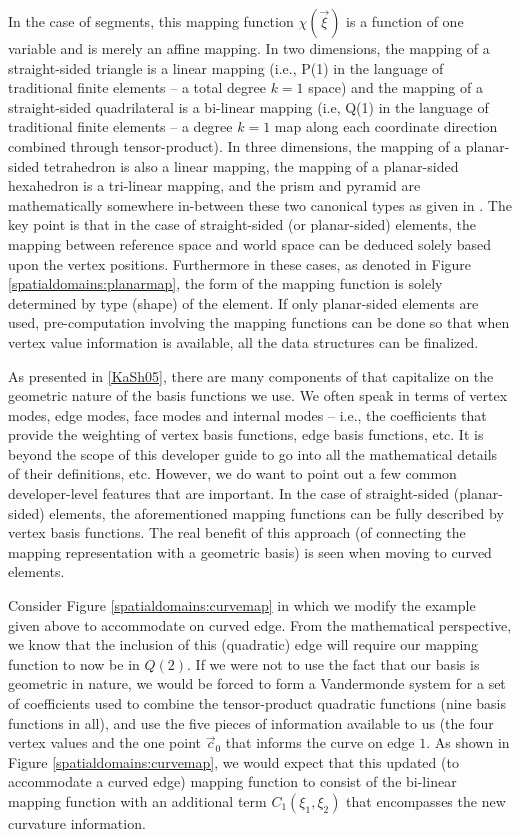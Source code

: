 In the case of segments, this mapping function $\chi(\vec{\xi})$ is a function of one variable and is merely an affine mapping.  In two dimensions, the 
mapping of a straight-sided triangle is a linear mapping (i.e., P(1) in the language of traditional finite elements -- a total degree $k=1$ space) and
the mapping of a straight-sided quadrilateral is a bi-linear mapping (i.e, Q(1) in the language of traditional finite elements -- a degree $k=1$ map along each
coordinate direction combined through tensor-product).  In three dimensions, the mapping of a planar-sided tetrahedron is also a linear mapping, the
mapping of a planar-sided hexahedron is a tri-linear mapping, and the prism and pyramid are mathematically somewhere in-between these two canonical
types as given in \cite{KaSh05}.  The key point is that in the case of straight-sided (or planar-sided) elements, the mapping between reference space and
world space can be deduced solely based upon the vertex positions.  Furthermore in these cases, 
as denoted in Figure \ref{spatialdomains:planarmap}, the form of the mapping function is solely determined by type (shape) of the element.  If
only planar-sided elements are used, pre-computation involving the mapping functions can be done so that when vertex value information is available,
all the data structures can be finalized.  

As presented in \ref{KaSh05}, there are many components of {\nek} that capitalize on the geometric nature of the basis functions we use.  We often
speak in terms of vertex modes, edge modes, face modes and internal modes -- i.e., the coefficients that provide the weighting of vertex basis functions,
edge basis functions, etc.  It is beyond the scope of this developer guide to go into all the mathematical details of their definitions, etc.  However, we do 
want to point out a few common developer-level features that are important.   In the case of straight-sided (planar-sided) elements, the aforementioned
mapping functions can be fully described by vertex basis functions.  The real benefit of this approach (of connecting the mapping representation with a
geometric basis) is seen when moving to curved elements.

Consider Figure \ref{spatialdomains:curvemap} in which we modify the example given above to accommodate on curved edge.  From the 
mathematical perspective, we know that the inclusion of this (quadratic) edge will require our mapping function to now be in $Q(2)$.  If we were
not to use the fact that our basis is geometric in nature, we would be forced to form a Vandermonde system for a set of coefficients used
to combine the tensor-product quadratic functions (nine basis functions in all), and use the five pieces of information available to us (the four
vertex values and the one point $\vec{c}_0$ that informs the curve on edge $1$.   As shown in Figure \ref{spatialdomains:curvemap}, we would
expect that this updated (to accommodate a curved edge) mapping function to consist of the bi-linear mapping 
function with an additional term $C_1(\xi_1,\xi_2)$ that encompasses the new curvature information.  

